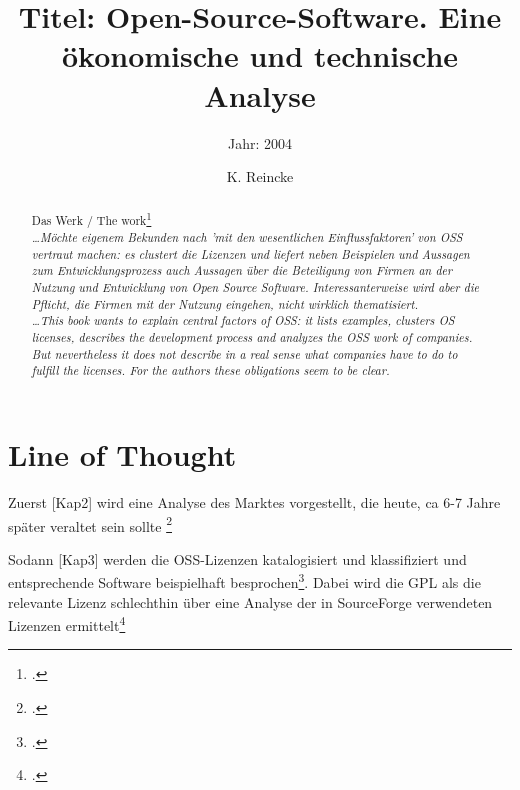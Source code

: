 \documentclass[DIV=calc,BCOR=5mm,11pt,headings=small,oneside,abstract=true, toc=bib]{scrartcl}
\begin{document}

\titlehead{Literaturexzerpt}
\subject{Autor(en): Brügger, Harhoff. Picot, Creighton, Fiedler, Henkel}
\title{Titel: Open-Source-Software. Eine ökonomische und technische Analyse}
\subtitle{Jahr: 2004 }
\author{K. Reincke}

\maketitle

\begin{abstract}
\noindent
Das Werk / The work\footcite[][]{BruHarPicCreFieHen2004a} \\
\noindent \itshape
\ldots Möchte eigenem Bekunden nach 'mit den wesentlichen Einflussfaktoren' von
OSS vertraut machen: es clustert die Lizenzen und liefert neben Beispielen und
Aussagen zum Entwicklungsprozess auch Aussagen über die Beteiligung von Firmen
an der Nutzung und Entwicklung von Open Source Software. Interessanterweise wird
aber die Pflicht, die Firmen mit der Nutzung eingehen, nicht wirklich
thematisiert. \\
\noindent
\ldots This book wants to explain central factors of OSS: it lists examples,
clusters OS licenses, describes the development process and analyzes the OSS
work of companies. But nevertheless it does not describe in a real sense what
companies have to do to fulfill the licenses. For the authors these obligations
seem to be clear.
\end{abstract}
\footnotesize
\normalsize

\section{Line of Thought}

Zuerst [Kap2] wird eine Analyse des Marktes vorgestellt, die heute, ca 6-7 Jahre
später veraltet sein sollte \footcite[vgl.][7-18]{BruHarPicCreFieHen2004a}

Sodann [Kap3] werden die OSS-Lizenzen katalogisiert und klassifiziert und
entsprechende Software beispielhaft
besprochen\footcite[vgl.][19-62]{BruHarPicCreFieHen2004a}. Dabei wird die GPL
als die relevante Lizenz schlechthin über eine Analyse der in
SourceForge verwendeten Lizenzen
ermittelt\footcite[vgl.][24 Dieses Verfahren dürfte
heute eher falsche Zahlen liefern, dennn Ecllipse und
Apache werden mittlerweil woanders gehostet. Stimmt
das?]{BruHarPicCreFieHen2004a}
\end{document}
